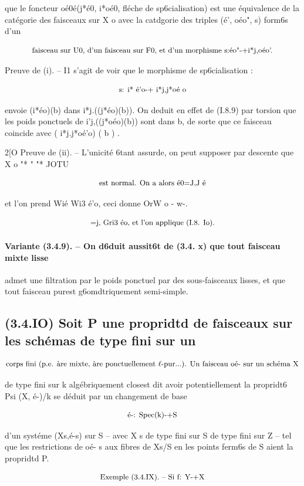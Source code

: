 \documentclass[11pt]{article}
\theoremstyle{remark}
\begin{document}
que le foncteur oé0é(j*é0, i*oé0, fléche de sp6cialisation) est une équivalence de la catégorie des faisceaux sur X o avec la catdgorie des triples (é', oéo", s) form6s d'un

\[\text{\small faisceau sur U0, d'un faisceau sur F0, et d'un morphisme s:éo"-+i*j,oéo'.}\]

Preuve de (i). -- I1 s'agit de voir que le morphisme de sp6cialisation :

\[\text{\small s: i* é'o-+ i*j,j*oé o}\]

envoie (i*éo)(b) dans i*j.((j*éo)(b)). On deduit en effet de (I.8.9) par torsion que les poids ponctuels de i'j,((j*oéo)(b)) sont dans b, de sorte que ce faisceau coincide avec ( i*j.j*oé'o) ( b ) .

2[O Preuve de (ii). -- L'unicité 6tant assurde, on peut supposer par descente que X o "* " "* JOTU

\[\text{\small est normal. On a alors é0=J,J é}\]

et l'on prend Wié Wi3 é'o, ceci donne OrW o - w-.

\[\text{\small =j, Gri3 éo, et l'on applique (I.8. Io).}\]

\paragraph{Variante (3.4.9). -- On d6duit aussit6t de (3.4. x) que tout faisceau mixte lisse}

admet une filtration par le poids ponctuel par des sous-faisceaux lisses, et que tout faisceau purest g6omdtriquement semi-simple.

\subsection*{(3.4.IO) Soit P une propridtd de faisceaux sur les schémas de type fini sur un}

\[\text{\small corps fini (p.e. àre mixte, àre ponctuellement \(\ell\)-pur...). Un faisceau oé- sur un schéma X}\]

de type fini sur k algébriquement closest dit avoir potentiellement la propridt6 Psi (X, é-)/k se déduit par un changement de base

\[\text{\small é-: Spec(k)-+S}\]

d'un systéme (Xs,é-s) sur S -- avec X s de type fini sur S de type fini sur Z -- tel que les restrictions de oé- s aux fibres de Xs/S en les points ferm6s de S aient la propridtd P.

\[\text{\small Exemple (3.4.IX). -- Si f: Y-+X}\]
\end{document}
